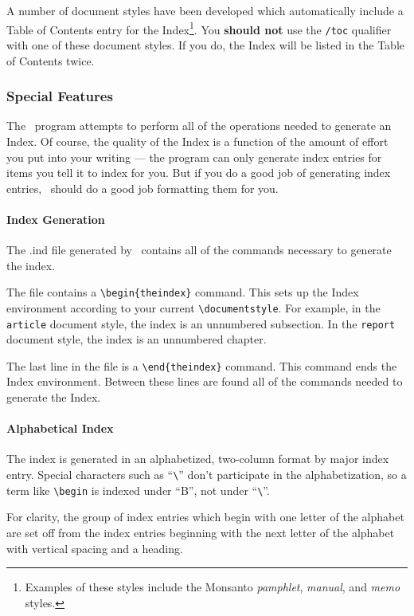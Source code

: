 A number of document styles have been developed which automatically include
a Table of Contents entry for the Index\footnote{Examples of these styles 
include the Monsanto {\em pamphlet}, {\em manual}, and {\em memo\/} styles.}.
You {\bf should not} use the \verb+/toc+ qualifier with one of these document styles.
If you do, the Index will be listed in the Table of Contents twice.


\subsubsection{Special Features}

The \IdxTeX\ program attempts to perform all of the operations needed to 
generate an Index.  Of course, the quality of the
Index is a function of the amount of effort you put into your writing --- the
program can only generate index entries for items you tell it to index for you.
But if you do a good job of generating index entries, \IdxTeX\ should do a good
job formatting them for you.


\paragraph{Index  Generation} 
The .ind file generated by \IdxTeX\ contains all of the commands
necessary to generate the index.  

The file contains a 
\verb~\begin{theindex}~ command.  This
sets up the Index environment according to your current \verb~\documentstyle~.
For example, in the {\tt article\/} document style, the index is an
unnumbered subsection.  In the {\tt report\/} document style, the index is
an unnumbered chapter.

The last line in the file is a \verb~\end{theindex}~ command.  This command
ends the Index environment.  Between these lines are found all of the commands
needed to generate the Index.

\paragraph{Alphabetical Index}  The index is generated in an alphabetized,
two-column format by major index entry.  Special characters such as
``\verb~\~'' don't participate in the alphabetization, so a term like
\verb~\begin~ is indexed under ``B'', not under ``\verb~\~''.

For clarity, the group of index entries which begin with one letter of the
alphabet are set off from the index entries beginning with the next letter of
the alphabet with vertical spacing and a heading.  

